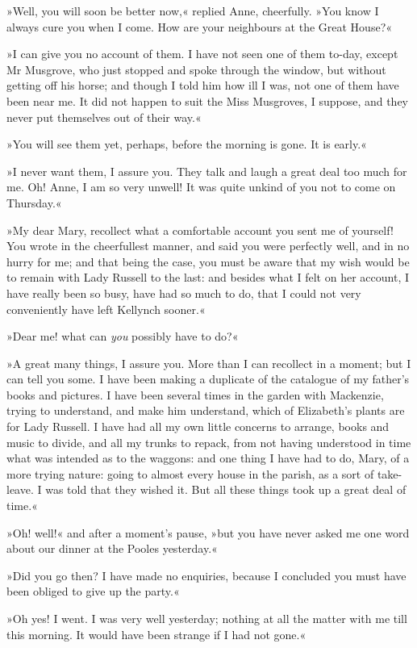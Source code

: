 »Well, you will soon be better now,« replied Anne, cheerfully. »You know I always cure you when I come. How are your neighbours at the Great House?«

»I can give you no account of them. I have not seen one of them to-day, except Mr Musgrove, who just stopped and spoke through the window, but without getting off his horse; and though I told him how ill I was, not one of them have been near me. It did not happen to suit the Miss Musgroves, I suppose, and they never put themselves out of their way.«

»You will see them yet, perhaps, before the morning is gone. It is early.«

»I never want them, I assure you. They talk and laugh a great deal too much for me. Oh! Anne, I am so very unwell! It was quite unkind of you not to come on Thursday.«

»My dear Mary, recollect what a comfortable account you sent me of yourself! You wrote in the cheerfullest manner, and said you were perfectly well, and in no hurry for me; and that being the case, you must be aware that my wish would be to remain with Lady Russell to the last: and besides what I felt on her account, I have really been so busy, have had so much to do, that I could not very conveniently have left Kellynch sooner.«

»Dear me! what can \textit{you} possibly have to do?«

»A great many things, I assure you. More than I can recollect in a moment; but I can tell you some. I have been making a duplicate of the catalogue of my father's books and pictures. I have been several times in the garden with Mackenzie, trying to understand, and make him understand, which of Elizabeth's plants are for Lady Russell. I have had all my own little concerns to arrange, books and music to divide, and all my trunks to repack, from not having understood in time what was intended as to the waggons: and one thing I have had to do, Mary, of a more trying nature: going to almost every house in the parish, as a sort of take-leave. I was told that they wished it. But all these things took up a great deal of time.«

»Oh! well!« and after a moment's pause, »but you have never asked me one word about our dinner at the Pooles yesterday.«

»Did you go then? I have made no enquiries, because I concluded you must have been obliged to give up the party.«

»Oh yes! I went. I was very well yesterday; nothing at all the matter with me till this morning. It would have been strange if I had not gone.«

